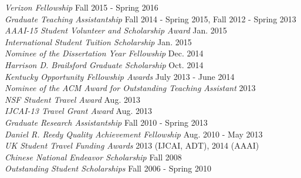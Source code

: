 
{\sl Verizon Fellowship}  \hfill Fall 2015 - Spring 2016\\
{\sl Graduate Teaching Assistantship}  \hfill Fall 2014 - Spring 2015, Fall 2012 - Spring 2013\\
{\sl AAAI-15 Student Volunteer and Scholarship Award}  \hfill Jan. 2015\\
{\sl International Student Tuition Scholarship}  \hfill Jan. 2015\\
{\sl Nominee of the Dissertation Year Fellowship}  \hfill Dec. 2014\\
{\sl Harrison D. Brailsford Graduate Scholarship}  \hfill Oct. 2014\\
{\sl Kentucky Opportunity Fellowship Awards}  \hfill July 2013 - June 2014\\
{\sl Nominee of the ACM Award for Outstanding Teaching Assistant}  \hfill 2013\\
{\sl NSF Student Travel Award}  \hfill Aug. 2013\\
{\sl IJCAI-13 Travel Grant Award}  \hfill Aug. 2013\\
{\sl Graduate Research Assistantship}  \hfill Fall 2010 - Spring 2013\\
{\sl Daniel R. Reedy Quality Achievement Fellowship} \hfill Aug. 2010 - May 2013\\
{\sl UK Student Travel Funding Awards}  \hfill 2013 (IJCAI, ADT), 2014 (AAAI)\\
{\sl Chinese National Endeavor Scholarship} \hfill Fall 2008\\
{\sl Outstanding Student Scholarships} \hfill Fall 2006 -  Spring 2010
\vspace{3pt}

